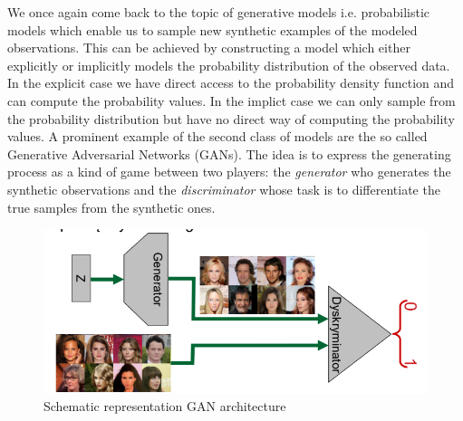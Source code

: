 \documentclass{myclass}
\begin{document}
We once again come back to the topic of generative models i.e. probabilistic models which enable us
to sample new synthetic examples of the modeled observations. This can be achieved by constructing a
model which either explicitly or implicitly models the probability distribution of the observed
data. In the explicit case we have direct access to the probability density function and can compute
the probability values. In the implict case we can only sample from the probability distribution but
have no direct way of computing the probability values. A prominent example of the second class of
models are the so called Generative Adversarial Networks (GANs). The idea is to express the
generating process as a kind of game between two players: the \emph{generator} who generates the
synthetic observations and the \emph{discriminator} whose task is to differentiate the true samples
from the synthetic ones.

\begin{figure}[ht]
   \centering
   \includegraphics[width=0.95\columnwidth]{figs/gan.png}
   \caption{Schematic representation GAN architecture}
   \label{fig:gan}
\end{figure}
\end{document}
